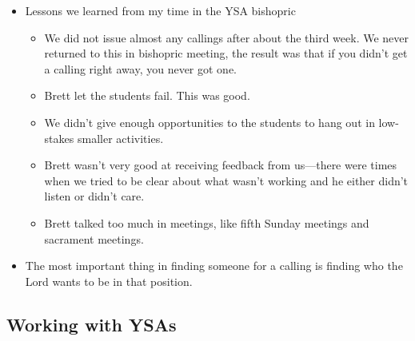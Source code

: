 		\begin{itemize}
		
			\item Lessons we learned from my time in the YSA bishopric
				\begin{itemize}
					\item We did not issue almost any callings after about the third week. We never returned to this in bishopric meeting, the result was that if you didn't get a calling right away, you never got one.
					\item Brett let the students fail. This was good. 
					\item We didn't give enough opportunities to the students to hang out in low-stakes smaller activities. 
					\item Brett wasn't very good at receiving feedback from us---there were times when we tried to be clear about what wasn't working and he either didn't listen or didn't care.
					\item Brett talked too much in meetings, like fifth Sunday meetings and sacrament meetings.
				\end{itemize}

			\item The most important thing in finding someone for a calling is finding who the Lord wants to be in that position.
		
		\end{itemize} 
	
	\subsection{Working with YSAs}
	
